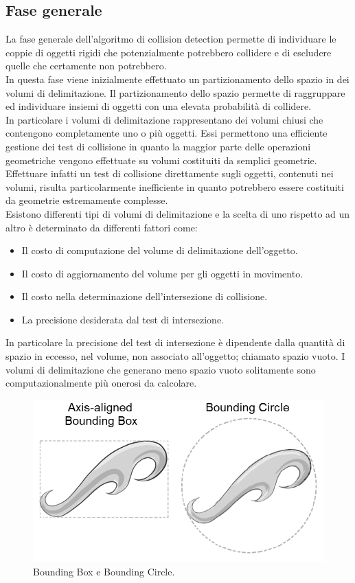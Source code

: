 \subsection{Fase generale}
La fase generale dell’algoritmo di collision detection permette di individuare le coppie di oggetti rigidi che potenzialmente potrebbero collidere e di escludere quelle che certamente non potrebbero.
\\
In questa fase viene inizialmente effettuato un partizionamento dello spazio in dei volumi di delimitazione. Il partizionamento dello spazio permette di raggruppare ed individuare insiemi di oggetti con una elevata probabilità di collidere.
\\
In particolare i volumi di delimitazione rappresentano dei volumi chiusi che contengono completamente uno o più oggetti. Essi permettono una efficiente gestione dei test di collisione in quanto la maggior parte delle operazioni geometriche vengono effettuate su volumi costituiti da semplici geometrie.
\\
Effettuare infatti un test di collisione direttamente sugli oggetti, contenuti nei volumi, risulta particolarmente inefficiente in quanto potrebbero essere costituiti da geometrie estremamente complesse.
\\
Esistono differenti tipi di volumi di delimitazione e la scelta di uno rispetto ad un altro è determinato da differenti fattori come:
\begin{itemize}
\item Il costo di computazione del volume di delimitazione dell’oggetto.
\item Il costo di aggiornamento del volume per gli oggetti in movimento.
\item Il costo nella determinazione dell’intersezione di collisione.
\item La precisione desiderata dal test di intersezione.
\end{itemize}
In particolare la precisione del test di intersezione è dipendente dalla quantità di spazio in eccesso, nel volume, non associato all’oggetto; chiamato spazio vuoto.
I volumi di delimitazione che generano meno spazio vuoto solitamente sono computazionalmente più onerosi da calcolare.
\begin{figure}[htb]
 \centering
 \includegraphics[width=1\linewidth]{images/chapter_navigazione_scena/box1.png}\hfill
 \caption[Bounding Box e Bounding Circle.]{Bounding Box e Bounding Circle.}
 \label{fig:navigazione_scena_navigator_oculus}
\end{figure}
